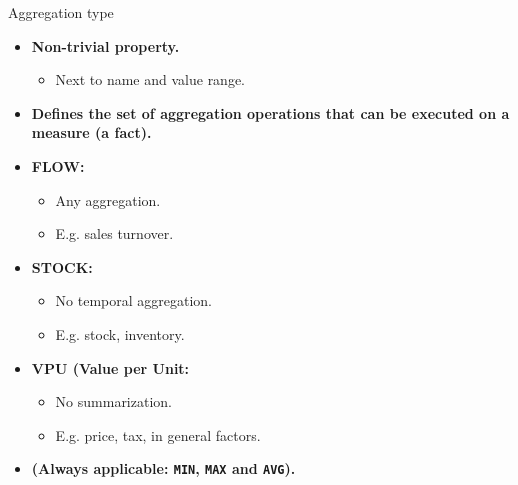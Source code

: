 \documentclass[aspectratio=169,t]{beamer}
\begin{document}
  { 
    \begin{frame}{Aggregation type}
        \begin{itemize}
            \item \textbf{Non-trivial property.}
            \begin{itemize}
              \item Next to name and value range.
            \end{itemize}
            \item \textbf{Defines the set of aggregation operations that can be executed on a measure (a fact).}
            \item \textbf{\color{airforceblue}FLOW:}
            \begin{itemize}
              \item Any aggregation.
              \item E.g. sales turnover.
            \end{itemize}
            \item \textbf{\color{airforceblue}STOCK:}
            \begin{itemize}
              \item No temporal aggregation.
              \item E.g. stock, inventory.
            \end{itemize}
            \item \textbf{\color{airforceblue}VPU (Value per Unit:}
            \begin{itemize}
              \item No summarization.
              \item E.g. price, tax, in general factors.
            \end{itemize}
            \item \textbf{(Always applicable: \texttt{MIN}, \texttt{MAX} and \texttt{AVG}).}
        \end{itemize}
    \end{frame}
  }
\end{document}
